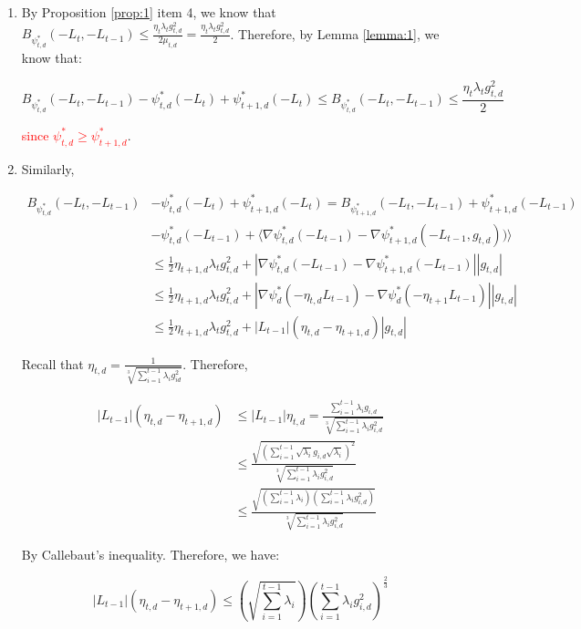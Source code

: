\documentclass{article}
\newcommand{\todo}[1]{\textcolor{red}{#1}}
\begin{document}
\begin{enumerate}
  \item By Proposition \ref{prop:1} item 4, we know that $B_{\psi_{t,d}^*}(-L_t, -L_{t-1}) \leq \frac{\eta_t \lambda_t
    g_{t,d}^2}{2 \mu_{t,d}} = \frac{\eta_t \lambda_t g_{t,d}^2}{2}$. Therefore, by Lemma \ref{lemma:1}, we know that:

    \[
      B_{\psi_{t,d}^*}(-L_t, -L_{t-1}) - \psi_{t,d}^*(-L_t) + \psi_{t+1,d}^*(-L_t) \leq B_{\psi_{t,d}^*}(-L_t,
      -L_{t-1}) \leq \frac{\eta_t \lambda_t g_{t,d}^2}{2}
    \]

    \todo{since $\psi_{t,d}^* \geq \psi_{t+1,d}^*$}.
  \item Similarly,

    \begin{align*}
      B_{\psi_{t,d}^*}(-L_t, -L_{t-1}) 
      &- \psi_{t,d}^*(-L_t) + \psi_{t+1,d}^*(-L_t) = B_{\psi_{t+1,d}^*}(-L_t, -L_{t-1}) + \psi_{t+1,d}^*(-L_{t-1}) \\
      & - \psi_{t,d}^*(-L_{t-1}) + \langle \nabla \psi_{t,d}^*(-L_{t-1}) - \nabla \psi_{t+1,d}^*(-L_{t-1},
      g_{t,d}))\rangle \\
      &\leq \frac{1}{2} \eta_{t+1,d}\lambda_t g_{t,d}^2 + | \nabla \psi_{t,d}^*(-L_{t-1}) - \nabla
      \psi_{t+1,d}^*(-L_{t-1})| |g_{t,d}| \\
      &\leq \frac{1}{2} \eta_{t+1,d}\lambda_t g_{t,d}^2 + | \nabla \psi_{d}^*(-\eta_{t,d} L_{t-1}) - \nabla
      \psi_{d}^*(-\eta_{t+1}L_{t-1})| |g_{t,d}| \\
      &\leq \frac{1}{2} \eta_{t+1,d}\lambda_t g_{t,d}^2 + |L_{t-1}|(\eta_{t,d} - \eta_{t+1,d})|g_{t,d}|
    \end{align*}

    Recall that $\eta_{t,d} = \frac{1}{\sqrt[3]{\sum\limits_{i=1}^{t-1} \lambda_i g_{id}^2}}$. Therefore,

    \begin{align*}
      |L_{t-1}|(\eta_{t,d} - \eta_{t+1,d}) 
      &\leq |L_{t-1}|\eta_{t,d} = \frac{\sum_{i=1}^{t-1} \lambda_i g_{i,d}}{\sqrt[3]{\sum_{i=1}^{t-1}\lambda_i
      g_{i,d}^2}} \\
      &\leq \frac{\sqrt{(\sum_{i=1}^{t-1} \sqrt{\lambda_i} g_{i,d}
      \sqrt{\lambda_i})^2}}{\sqrt[3]{\sum_{i=1}^{t-1} \lambda_i g_{i,d}^2}} \\
      &\leq \frac{\sqrt{(\sum_{i=1}^{t-1} \lambda_i)(\sum_{i=1}^{t-1}\lambda_i g_{i,d}^2)}}{\sqrt[3]{\sum_{i=1}^{t-1} \lambda_i g_{i,d}^2}}
    \end{align*}

    By Callebaut's inequality. Therefore, we have:

    \[
      |L_{t-1}|(\eta_{t,d} - \eta_{t+1,d}) \leq \left(\sqrt{\sum_{i=1}^{t-1} \lambda_i}\right)\left(\sum_{i=1}^{t-1}\lambda_i
      g_{i,d}^2\right)^\frac{2}{3}
    \]
\end{enumerate}
\end{document}
